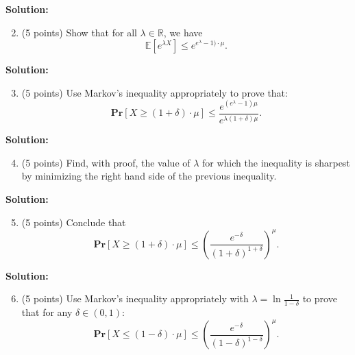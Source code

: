 \documentclass[11pt]{article}
\newcommand{\Ex}[1]{\ensuremath{\mathbb{E}\left[#1\right]}}
\newcommand{\PPr}[1]{\ensuremath{\mathbf{Pr}\left[#1\right]}}
\begin{document}
\noindent\textbf{Solution:}







\begin{enumerate}
\setcounter{enumi}{1}
\item (5 points)
Show that for all $\lambda\in\mathbb{R}$, we have 
\[\Ex{e^{\lambda X}}\le e^{e^\lambda-1)\cdot\mu}.\]
\end{enumerate}

\noindent\textbf{Solution:}




\begin{enumerate}
\setcounter{enumi}{2}
\item (5 points)
Use Markov's inequality appropriately to prove that:
\[\PPr{X\ge(1+\delta)\cdot\mu}\le\frac{e^{(e^\lambda-1)\mu}}{e^{\lambda(1+\delta)\mu}}.\]
\end{enumerate}

\noindent\textbf{Solution:}





\begin{enumerate}
\setcounter{enumi}{3}
\item (5 points)
Find, with proof, the value of $\lambda$ for which the inequality is sharpest by minimizing the right hand side of the previous inequality. 
\end{enumerate}

\noindent\textbf{Solution:}




\begin{enumerate}
\setcounter{enumi}{4}
\item (5 points)
Conclude that
\[\PPr{X\ge(1+\delta)\cdot\mu}\le\left(\frac{e^{-\delta}}{(1+\delta)^{1+\delta}}\right)^\mu.\]
\end{enumerate}

\noindent\textbf{Solution:}





\begin{enumerate}
\setcounter{enumi}{5}
\item (5 points)
Use Markov's inequality appropriately with $\lambda=\ln\frac{1}{1-\delta}$ to prove that for any $\delta\in(0,1)$:
\[\PPr{X\le(1-\delta)\cdot\mu}\le\left(\frac{e^{-\delta}}{(1-\delta)^{1-\delta}}\right)^\mu.\]
\end{enumerate}
\end{document}
